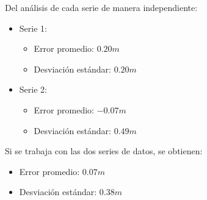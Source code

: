 \documentclass[main]{subfiles}
\begin{document}
\begin{figure}
\vspace{-10pt}

  \caption{}
\label{fig:1-metro-err}
\vspace{-110pt}
\end{figure}

Del análisis de cada serie de manera independiente:
\begin{itemize}
\item Serie 1:
		\begin{itemize}
		\item Error promedio: $0.20m$
		\item Desviación estándar: $0.20m$
		\end{itemize}
\item Serie 2:
		\begin{itemize}
		\item Error promedio: $-0.07m$
		\item Desviación estándar: $0.49m$
		\end{itemize}
\end{itemize}

Si se trabaja con las dos series de datos, se obtienen:

\begin{itemize}
\item Error promedio: $0.07m$
\item Desviación estándar: $0.38m$
\end{itemize}
\end{document}
